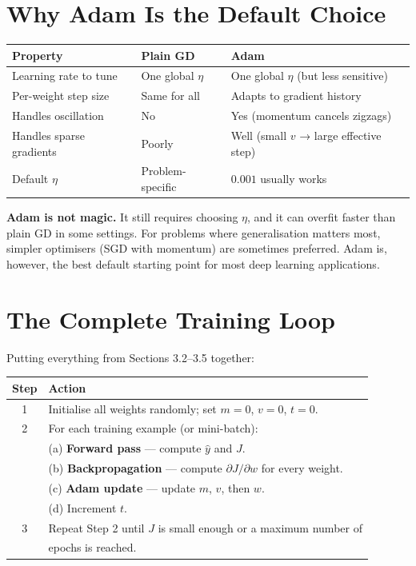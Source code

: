 \documentclass[12pt, a4paper]{article}
\theoremstyle{definition}
\newcommand{\yhat}{\hat{y}}
\begin{document}
\section{Why Adam Is the Default Choice}

\begin{center}
\renewcommand{\arraystretch}{1.3}
\begin{tabular}{lll}
\toprule
Property & Plain GD & Adam \\
\midrule
Learning rate to tune & One global $\eta$ & One global $\eta$ (but less sensitive) \\
Per-weight step size  & Same for all & Adapts to gradient history \\
Handles oscillation   & No  & Yes (momentum cancels zigzags) \\
Handles sparse gradients & Poorly & Well (small $v$ → large effective step) \\
Default $\eta$        & Problem-specific & $0.001$ usually works \\
\bottomrule
\end{tabular}
\end{center}

\begin{warnbox}
\textbf{Adam is not magic.}
It still requires choosing $\eta$, and it can overfit faster than plain GD
in some settings.  For problems where generalisation matters most, simpler
optimisers (SGD with momentum) are sometimes preferred.  Adam is, however,
the best default starting point for most deep learning applications.
\end{warnbox}

\section{The Complete Training Loop}

Putting everything from Sections 3.2--3.5 together:

\vspace{0.5em}
\begin{center}
\renewcommand{\arraystretch}{1.5}
\begin{tabular}{cl}
\toprule
Step & Action \\
\midrule
1 & Initialise all weights randomly; set $m = 0$, $v = 0$, $t = 0$. \\
2 & For each training example (or mini-batch): \\
  & \quad (a) \textbf{Forward pass} --- compute $\yhat$ and $J$. \\
  & \quad (b) \textbf{Backpropagation} --- compute $\partial J/\partial w$
              for every weight. \\
  & \quad (c) \textbf{Adam update} --- update $m$, $v$, then $w$. \\
  & \quad (d) Increment $t$. \\
3 & Repeat Step 2 until $J$ is small enough or a maximum number of \\
  & epochs is reached. \\
\bottomrule
\end{tabular}
\end{center}
\end{document}
